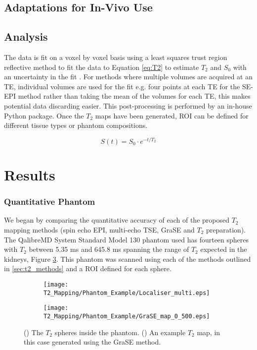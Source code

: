 \subsection{Adaptations for In-Vivo Use}

\subsection{Analysis}

The data is fit on a voxel by voxel basis using a least squares trust region reflective method to fit the data to Equation \eqref{eq:T2} to estimate $T_2$ and $S_0$ with an uncertainty in the fit \cite{branch_subspace_1999}. For methods where multiple volumes are acquired at an \ac{TE}, individual volumes are used for the fit e.g. four points at each \ac{TE} for the \ac{SE}-\ac{EPI} method rather than taking the mean of the volumes for each \ac{TE}, this makes potential data discarding easier. This post-processing is performed by an in-house Python package. Once the $T_2$ maps have been generated, \ac{ROI} can be defined for different tissue types or phantom compositions.

\begin{equation}
S(t) = S_0 \cdot e^{-t/T_2}
\label{eq:T2}
\end{equation}

\section{Results}

\subsubsection{Quantitative Phantom}

We began by comparing the quantitative accuracy of each of the proposed $T_2$ mapping methods (spin echo \ac{EPI}, multi-echo \ac{TSE}, \ac{GraSE} and $T_2$ preparation).  The QalibreMD System Standard Model 130 phantom used has fourteen spheres with $T_2$ between 5.35 ms and 645.8 ms spanning the range of $T_2$ expected in the kidneys, Figure \ref{fig:t2_phantom_eg}. This phantom was scanned using each of the methods outlined in \ref{sec:t2_methods} and a \ac{ROI} defined for each sphere. 

\begin{figure}[H]
	\centering
	\begin{subfigure}[c]{0.47\textwidth}
		\centering
		\texttt{[image: T2\_Mapping/Phantom\_Example/Localiser\_multi.eps]}
		\caption{}
		\label{fig:t2_phantom_loc}
	\end{subfigure}
	\hfill
	\begin{subfigure}[c]{0.47\textwidth}
		\centering
		\texttt{[image: T2\_Mapping/Phantom\_Example/GraSE\_map\_0\_500.eps]}
		\caption{}
		\label{fig:t2_phantom_map}
	\end{subfigure}
	\caption{() The $T_2$ spheres inside the phantom. () An example $T_2$ map, in this case generated using the \ac{GraSE} method.}
	\label{fig:t2_phantom_eg}
\end{figure}

